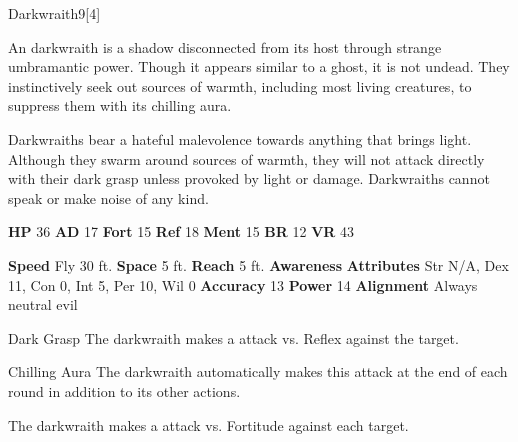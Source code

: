   \begin{monsection}{Darkwraith}{9}[4]
    \vspace{-1em}\vspace{-1em}
    \vspace{0em}

    
        An darkwraith is a shadow disconnected from its host through strange umbramantic power.
        Though it appears similar to a ghost, it is not undead.
        They instinctively seek out sources of warmth, including most living creatures, to suppress them with its chilling aura.
      
        Darkwraiths bear a hateful malevolence towards anything that brings light.
        Although they swarm around sources of warmth, they will not attack directly with their dark grasp unless provoked by light or damage.
        Darkwraiths cannot speak or make noise of any kind.
      

    \begin{spellcontent}
      \begin{spelltargetinginfo}
        \pari \textbf{HP} 36 \monsep
          \textbf{AD} 17 \monsep
          \textbf{Fort} 15 \monsep
          \textbf{Ref} 18 \monsep
          \textbf{Ment} 15
        \pari \textbf{BR} 12 \monsep
        \textbf{VR} 43
        
      \end{spelltargetinginfo}
    \end{spellcontent}
    \begin{monsterfooter}
      \pari \textbf{Speed} Fly 30 ft. \monsep
        \textbf{Space} 5 ft. \monsep
        \textbf{Reach} 5 ft.
      \pari \textbf{Awareness} 
      \pari \textbf{Attributes}
        Str N/A, Dex 11,
        Con 0, Int 5,
        Per 10, Wil 0
      \pari \textbf{Accuracy} 13 \monsep
        \textbf{Power} 14
      \pari \textbf{Alignment} Always neutral evil
    \end{monsterfooter}
  \end{monsection}
  \begin{freeability}{Dark Grasp}
       The darkwraith makes a  attack
        vs. Reflex against the target.
    \end{freeability}
  

    \begin{freeability}{Chilling Aura}
      The darkwraith automatically makes this attack at the end of each round in addition to its other actions.
          \par The darkwraith makes a  attack
        vs. Fortitude against each target.
    \end{freeability}
  

